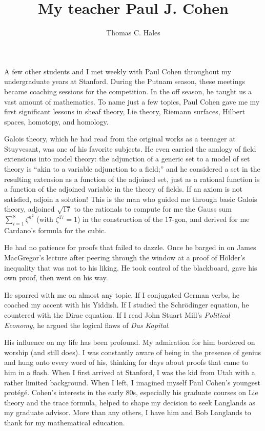 \documentclass{llncs}
\begin{document}
\title{My teacher Paul J. Cohen}
\author{Thomas C. Hales}
\maketitle


\section*{}

A few other
students and I met weekly with Paul Cohen throughout my undergraduate
years at Stanford.  
During the Putnam season, these meetings became coaching sessions
for the competition.  In the off season, he taught us a vast amount of
mathematics.
To name just a few topics, Paul Cohen gave me my first significant lessons in
sheaf theory, Lie theory, Riemann surfaces, Hilbert spaces, 
homotopy, and homology.


Galois theory, which he had read from the original works
as a teenager at Stuyvesant, was one of his favorite subjects.  He even carried the analogy of field extensions into model theory: the adjunction of a generic set to a model of set theory is ``akin to a variable adjunction to a field;'' and he considered a set in the resulting extension
as a function of the adjoined set, just as a rational function is a function of
the adjoined variable in the theory of fields.  If an axiom is not satisfied, adjoin
a solution!
This is the man who guided me through basic Galois theory, adjoined $\sqrt{17}$ to the rationals to compute for me the Gauss sum
 $
 \sum_{i=1}^8 \zeta^{n^2}$  (with $\zeta^{17}=1$) in the construction of the $17$-gon, 
and derived for me Cardano's formula for the cubic.  


He had no patience for proofs that failed to dazzle.
Once he barged in on James MacGregor's lecture after peering through the window at a proof of H\"older's inequality that was not to his liking.  He took control of the blackboard,  gave his own proof, then went on his way.


He sparred with me on almost any topic.  If I conjugated German verbs, he coached my accent with his Yiddish.  If I studied the Schr\"odinger equation, he countered with the Dirac equation.  If I read John Stuart Mill's {\it Political Economy}, he argued the logical flaws of {\it Das Kapital}.



His influence on my life has been profound.
My admiration for him bordered on worship (and still does).
I was constantly aware of being in the presence of genius and hung onto every word of his,
thinking for days about proofs that came to him in a flash.
When I first arrived at Stanford, I was the
kid from Utah with a rather limited background.  When I left,  I imagined myself Paul Cohen's
youngest prot\'eg\'e.  Cohen's interests in the early 80s, especially his graduate courses on Lie theory and the trace formula, helped to shape
my decision to seek  Langlands as my graduate advisor.
More than any others, I have him and Bob Langlands to thank for my mathematical education.
\end{document}
